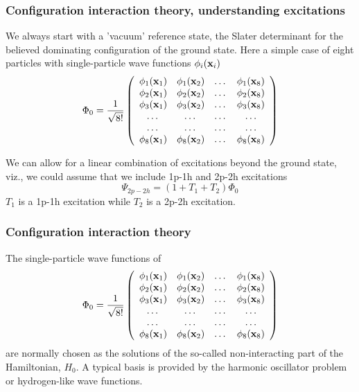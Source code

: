  \frame
 {
   \frametitle{Configuration interaction theory, understanding excitations}
 \begin{small}
 {\scriptsize
 We always start with a 'vacuum' reference state, the Slater determinant for the believed
 dominating configuration of the ground state. Here a simple case of
 eight particles with single-particle wave functions $\phi_i({\bf x}_i)$
 \[
 \Phi_0 =
       \frac{1}{\sqrt{8!}}\left( \begin{array}{cccc} 
 \phi_1({\bf x}_1) & \phi_1({\bf x}_2) & \dots & \phi_1({\bf x}_8) \\
 \phi_2({\bf x}_1) & \phi_2({\bf x}_2) & \dots & \phi_2({\bf x}_8) \\
 \phi_3({\bf x}_1) & \phi_3({\bf x}_2) & \dots & \phi_3({\bf x}_8) \\
 \dots & \dots & \dots & \dots \\ \dots & \dots & \dots & \dots \\
 \phi_8({\bf x}_1) & \phi_8({\bf x}_2) & \dots & \phi_8({\bf x}_8) 
	      \end{array} \right)
 \]

 We can allow for a linear combination of excitations beyond the ground state, viz., we could assume that we include 1p-1h and 2p-2h excitations
 \[
 \Psi_{2p-2h}=(1+T_1+T_2)\Phi_0
 \]
 $T_1$ is a 1p-1h excitation while $T_2$ is a 2p-2h excitation.
 }
 \end{small}

 }



 \frame
 {
   \frametitle{Configuration interaction theory}
 \begin{small}
 {\scriptsize
The single-particle wave functions of 
 \[
 \Phi_0 =
       \frac{1}{\sqrt{8!}}\left( \begin{array}{cccc} 
 \phi_1({\bf x}_1) & \phi_1({\bf x}_2) & \dots & \phi_1({\bf x}_8) \\
 \phi_2({\bf x}_1) & \phi_2({\bf x}_2) & \dots & \phi_2({\bf x}_8) \\
 \phi_3({\bf x}_1) & \phi_3({\bf x}_2) & \dots & \phi_3({\bf x}_8) \\
 \dots & \dots & \dots & \dots \\ \dots & \dots & \dots & \dots \\
 \phi_8({\bf x}_1) & \phi_8({\bf x}_2) & \dots & \phi_8({\bf x}_8) 
	      \end{array} \right)
 \]
are normally chosen as the solutions of the so-called non-interacting part of the
Hamiltonian, $H_0$.  A typical basis is provided by the harmonic oscillator problem or hydrogen-like wave functions.
 }
 \end{small}

 }


